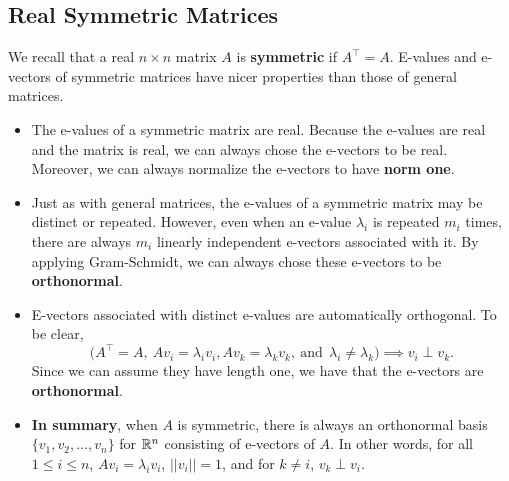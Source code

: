 \subsection{Real Symmetric Matrices}
\label{sec:RealSymmetricMatrices}

We recall that a real  $n\times n$ matrix $A$ is \textbf{symmetric} if $A^\top=A$. E-values and e-vectors of symmetric matrices have nicer properties than those of general matrices. 

\begin{tcolorbox}[title=\textbf{\large E-values and E-vectors of Symmetric Matrices}]

\begin{itemize}
    \item The e-values of a symmetric matrix are real. Because the e-values are real and the matrix is real, we can always chose the e-vectors to be real. Moreover, we can always normalize the e-vectors to have \textbf{norm one}.
    
    \item Just as with general matrices, the e-values of a symmetric matrix may be distinct or repeated. However, even when an e-value $\lambda_i$ is repeated $m_i$ times, there are always $m_i$ linearly independent e-vectors associated with it. By applying Gram-Schmidt, we can always chose these e-vectors to be \textbf{orthonormal}.
    
    \item E-vectors associated with distinct e-values are automatically orthogonal. To be clear, $$ \big(A^\top = A,~Av_i = \lambda_i v_i, Av_k = \lambda_k v_k,~\text{and} ~~\lambda_i \neq \lambda_k \big) \implies v_i \perp v_k.$$
    Since we can assume they have length one, we have that the e-vectors are \textbf{orthonormal}.
    
    \item \textbf{In summary}, when $A$ is symmetric, there is always an orthonormal basis $\{v_1, v_2, \ldots, v_n \}$ for $\mathbb R^n$ consisting of e-vectors of $A$. In other words, for all $1 \le i \le n$, $Av_i = \lambda_i v_i$, $||v_i||=1$, and for $k \neq i$, $v_k \perp v_i$.
\end{itemize}

\end{tcolorbox}

\vspace*{.2cm}

